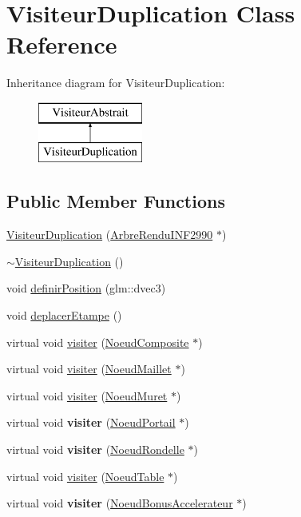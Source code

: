\hypertarget{class_visiteur_duplication}{}\section{Visiteur\+Duplication Class Reference}
\label{class_visiteur_duplication}
Inheritance diagram for Visiteur\+Duplication\+:\begin{figure}[H]
\begin{center}
\leavevmode
\includegraphics[height=2.000000cm]{class_visiteur_duplication}
\end{center}
\end{figure}
\subsection*{Public Member Functions}
\begin{DoxyCompactItemize}
\item 
\hyperlink{group__inf2990_gab7f16d7325839d400df6da191430fbd8}{Visiteur\+Duplication} (\hyperlink{class_arbre_rendu_i_n_f2990}{Arbre\+Rendu\+I\+N\+F2990} $\ast$)
\item 
\hyperlink{group__inf2990_gab48c0bd69fe4738d85ec48bfe1ae51ea}{$\sim$\+Visiteur\+Duplication} ()
\item 
void \hyperlink{group__inf2990_ga1482d7144bc781ddbef06292573872a8}{definir\+Position} (glm\+::dvec3)
\item 
void \hyperlink{group__inf2990_ga44443631965b05df20db383d723765e2}{deplacer\+Etampe} ()
\item 
virtual void \hyperlink{group__inf2990_gaa66f13da730ff20959fd4c7b24c2c6ea}{visiter} (\hyperlink{class_noeud_composite}{Noeud\+Composite} $\ast$)
\item 
virtual void \hyperlink{group__inf2990_ga0300496a83fea5642c06b86fce6cd17e}{visiter} (\hyperlink{class_noeud_maillet}{Noeud\+Maillet} $\ast$)
\item 
virtual void \hyperlink{group__inf2990_ga03689e8ff1b47c750834eb2d593b8fcf}{visiter} (\hyperlink{class_noeud_muret}{Noeud\+Muret} $\ast$)
\item 
virtual void {\bfseries visiter} (\hyperlink{class_noeud_portail}{Noeud\+Portail} $\ast$)
\item 
virtual void {\bfseries visiter} (\hyperlink{class_noeud_rondelle}{Noeud\+Rondelle} $\ast$)
\item 
virtual void \hyperlink{group__inf2990_gab0e86c310bdfeeddf6787dc8a25030ef}{visiter} (\hyperlink{class_noeud_table}{Noeud\+Table} $\ast$)
\item 
virtual void {\bfseries visiter} (\hyperlink{class_noeud_bonus_accelerateur}{Noeud\+Bonus\+Accelerateur} $\ast$)
\end{DoxyCompactItemize}
